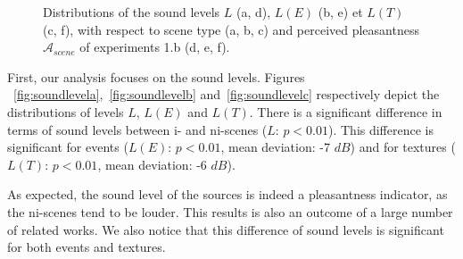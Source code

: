 \documentclass[12pt]{elsarticle}
\begin{document}
\begin{figure}[t]
       \caption{Distributions of the sound levels $L$ (a, d), $L(E)$ (b, e) et $L(T)$ (c, f), with respect to scene type (a, b, c) and perceived pleasantness $\mathcal{A}_{scene}$ of experiments 1.b (d, e, f).}
\end{figure}


First, our analysis focuses on the sound levels. Figures ~\ref{fig:soundlevela},~\ref{fig:soundlevelb} and~\ref{fig:soundlevelc} respectively depict the distributions of levels $L$, $L(E)$ and $L(T)$. There is a significant difference in terms of sound levels between i- and ni-scenes ($L$: $p<0.01$). This difference is significant for events ($L(E)$: $p<0.01$, mean deviation: -7 $dB$) and for textures ($L(T)$: $p<0.01$, mean deviation: -6 $dB$).


As expected, the sound level of the sources is indeed a pleasantness indicator, as the ni-scenes tend to be louder. This results is also an outcome of a large number of related works. We also notice that this difference of sound levels is significant for both events and textures.
\end{document}
